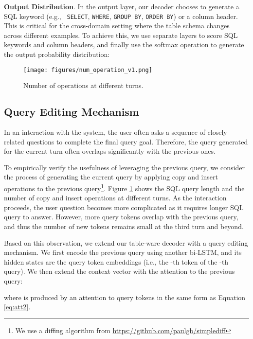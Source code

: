 \documentclass[11pt,a4paper]{article}
\begin{document}
\textbf{Output Distribution}. In the output layer, our decoder chooses to generate a SQL keyword (e.g., \texttt{
SELECT}, \texttt{WHERE}, \texttt{GROUP BY}, \texttt{ORDER BY}) or a column header.
This is critical for the cross-domain setting where the table schema changes across different examples.
To achieve this, we use separate layers to score SQL keywords and column headers, and finally use the softmax operation to generate the output probability distribution:


\begin{figure}[t!]
  \centering
  \texttt{[image: figures/num\_operation\_v1.png]}
  \caption{Number of operations at different turns.}
  \vspace{-4mm}
  \label{fig:num_operation}
\end{figure}

\vspace{-2mm}
\subsection{Query Editing Mechanism}
\label{sec:query_edit}
In an interaction with the system, the user often asks a sequence of closely related questions to complete the final query goal.
Therefore, the query generated for the current turn often overlaps significantly with the previous ones.

To empirically verify the usefulness of leveraging the previous query, 
we consider the process of generating the current query by applying copy and insert operations to the previous query\footnote{We use a diffing algorithm from \url{https://github.com/paulgb/simplediff}}.
Figure \ref{fig:num_operation} shows the SQL query length and the number of copy and insert operations at different turns.
As the interaction proceeds, the user question becomes more complicated as it requires longer SQL query to answer.
However, more query tokens overlap with the previous query, and thus the number of new tokens remains small at the third turn and beyond.

Based on this observation, we extend our table-ware decoder with a query editing mechanism.
We first encode the previous query using another bi-LSTM, and its hidden states are the query token embeddings  (i.e., the -th token of the -th query).
We then extend the context vector with the attention to the previous query:

where  is produced by an attention to query tokens  in the same form as Equation \ref{eq:att2}.
\end{document}
